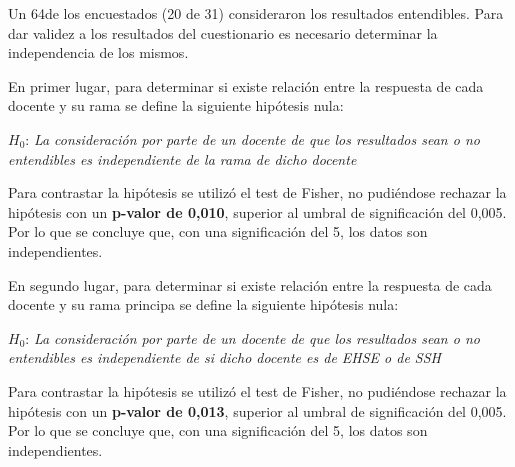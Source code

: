 Un 64\percentage{ }de los encuestados (20 de 31) consideraron los resultados entendibles. Para dar validez a los resultados del cuestionario es necesario determinar la independencia de los mismos.

En primer lugar, para determinar si existe relación entre la respuesta de cada docente y su rama se define la siguiente hipótesis nula:

\medskip
\begin{mdframed}[style=hipotesis0]
$H_0$: \emph{La consideración por parte de un docente de que los resultados sean o no entendibles es independiente de la rama de dicho docente}
\end{mdframed}

\medskip
Para contrastar la hipótesis se utilizó el test de Fisher, no pudiéndose rechazar la hipótesis con un \textbf{p-valor de 0,010}, superior al umbral de significación del 0,005. Por lo que se concluye que, con una significación del 5\percentage, los datos son independientes.

En segundo lugar, para determinar si existe relación entre la respuesta de cada docente y su rama principa se define la siguiente hipótesis nula:

\medskip
\begin{mdframed}[style=hipotesis0]
$H_0$: \emph{La consideración por parte de un docente de que los resultados sean o no entendibles es independiente de si dicho docente es de EHSE o de SSH}
\end{mdframed}

\medskip
Para contrastar la hipótesis se utilizó el test de Fisher, no pudiéndose rechazar la hipótesis con un \textbf{p-valor de 0,013}, superior al umbral de significación del 0,005. Por lo que se concluye que, con una significación del 5\percentage, los datos son independientes.
